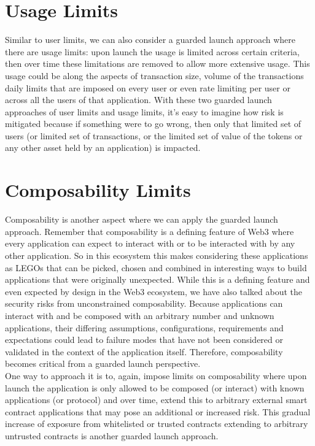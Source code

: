 \section{Usage Limits}
Similar to user limits, we can also consider a guarded launch approach where there are usage limits: upon launch the usage is limited across certain criteria, then over time these limitations are removed to allow more extensive usage. This usage could be along the aspects of transaction size, volume of the transactions daily limits that are imposed on every user or even rate limiting per user or across all the users of that application. With these two guarded launch approaches of user limits and usage limits, it's easy to imagine how risk is mitigated because if something were to go wrong, then only that limited set of users (or limited set of transactions, or the limited set of value of the tokens or any other asset held by an application) is impacted.

\section{Composability Limits}
Composability is another aspect where we can apply the guarded launch approach. Remember that composability is a defining feature of Web3 where every application can expect to interact with or to be interacted with by any other application. So in this ecosystem this makes considering these applications as LEGOs that can be picked, chosen and combined in interesting ways to build applications that were originally unexpected. While this is a defining feature and even expected by design in the Web3 ecosystem, we have also talked about the security risks from unconstrained composability. Because applications can interact with and be composed with an arbitrary number and unknown applications, their differing assumptions, configurations, requirements and expectations could lead to failure modes that have not been considered or validated in the context of the application itself. Therefore, composability becomes critical from a guarded launch perspective.\\

One way to approach it is to, again, impose limits on composability where upon launch the application is only allowed to be composed (or interact) with known applications (or protocol) and over time, extend this to arbitrary external smart contract applications that may pose an additional or increased risk. This gradual increase of exposure from whitelisted or trusted contracts extending to arbitrary untrusted contracts is another guarded launch approach.


